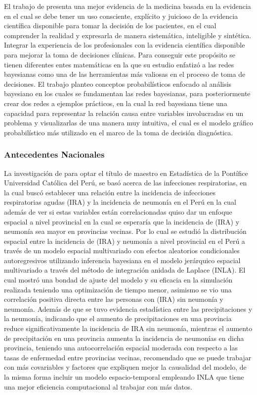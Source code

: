 El trabajo de \cite{ferez2017redes} presenta una mejor evidencia de la medicina basada en la evidencia en el cual se debe tener un uso consciente, explícito y juicioso de la evidencia científica disponible para tomar la decisión de los pacientes, en el cual comprender la realidad y expresarla de manera sistemática, inteligible y sintética. Integrar la experiencia de los profesionales con la evidencia científica disponible para mejorar la toma de decisiones clínicas. Para conseguir este propósito se tienen diferentes entes matemáticas en la que su estudio enfatizó a las redes bayesianas como una de las herramientas más valiosas en el proceso de toma de decisiones. El trabajo planteo conceptos probabilísticos enfocado al análisis bayesiano en los cuales se fundamentan las redes bayesianas, para posteriormente crear dos redes a ejemplos prácticos, en la cual la red bayesiana tiene una capacidad para representar la relación causa entre variables involucradas en un problema y visualizarlas de una manera muy intuitiva, el cual es el modelo gráfico probabilístico más utilizado en el marco de la toma de decisión diagnóstica.

\subsubsection{Antecedentes Nacionales}
La investigación de \cite{lopezmodelamiento} para optar el título de maestro en Estadística de la Pontífice Universidad Católica del Perú, se basó acerca de las infecciones respiratorias, en la cual buscó establecer una relación entre la incidencia de infecciones respiratorias agudas (IRA) y la incidencia de neumonía en el Perú en la cual además de ver si estas variables están correlacionadas quiso dar un enfoque espacial a nivel provincial en la cual se esperaría que la incidencia de (IRA) y neumonía sea mayor en provincias vecinas. Por lo cual se estudió la distribución espacial entre la incidencia de (IRA) y neumonía a nivel provincial en el Perú a través de un modelo espacial multivariado con efectos aleatorios condicionales autoregresivos utilizando inferencia bayesiana en el modelo jerárquico espacial multivariado a través del método de integración anidada de Laplace (INLA). El cual mostró una bondad de ajuste del modelo y su eficacia en la simulación realizada teniendo una optimización de tiempo menor, asimismo se vio una correlación positiva directa entre las personas con (IRA) sin neumonía y neumonía. Además de que se tuvo evidencia estadística entre las precipitaciones y la neumonía, indicando que el aumento de precipitaciones en una provincia reduce significativamente la incidencia de IRA sin neumonía, mientras el aumento de precipitación en una provincia aumenta la incidencia de neumonías en dicha provincia, teniendo una autocorrelación espacial moderada con respecto a las tasas de enfermedad entre provincias vecinas, recomendado que se puede trabajar con más covariables y factores que expliquen mejor la causalidad del modelo, de la misma forma incluir un modelo espacio-temporal empleando INLA que tiene una mejor eficiencia computacional al trabajar con más datos.

